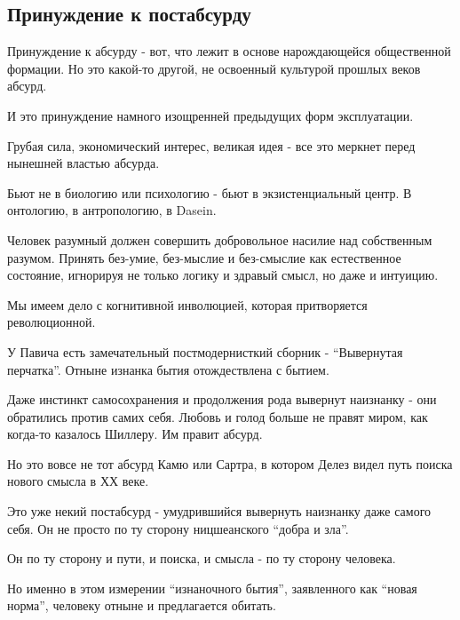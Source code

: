  
 
 
 
 
\subsection{Принуждение к постабсурду}

Принуждение к абсурду - вот, что лежит в основе нарождающейся общественной
формации. Но это какой-то другой, не освоенный культурой прошлых веков абсурд.

И это принуждение намного изощренней предыдущих форм эксплуатации.

Грубая сила, экономический интерес, великая идея - все это меркнет перед
нынешней властью абсурда. 

Бьют не в биологию или психологию - бьют в экзистенциальный центр. В онтологию,
в антропологию, в Dasein.

Человек разумный должен совершить добровольное насилие над собственным разумом.
Принять без-умие, без-мыслие и без-смыслие как естественное состояние,
игнорируя не только логику и здравый смысл, но даже и интуицию.

Мы имеем дело с когнитивной инволюцией, которая притворяется  революционной.

У Павича есть замечательный постмодернисткий сборник - \enquote{Вывернутая перчатка}.
Отныне изнанка бытия отождествлена с бытием. 

Даже инстинкт самосохранения и продолжения рода вывернут наизнанку - они
обратились против самих себя. Любовь и голод больше не правят миром, как
когда-то казалось Шиллеру. Им правит абсурд.

Но это вовсе не тот абсурд Камю или Сартра, в котором Делез видел путь поиска
нового смысла в ХХ веке. 

Это уже некий постабсурд - умудрившийся вывернуть наизнанку даже самого себя.
Он не просто по ту сторону ницшеанского \enquote{добра и зла}. 

Он по ту сторону и пути, и поиска, и смысла -  по ту сторону человека. 

Но именно в этом  измерении \enquote{изнаночного бытия}, заявленного как \enquote{новая норма},
человеку отныне и предлагается обитать.
